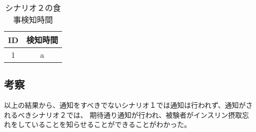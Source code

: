 \begin{table}[htbp]
  \caption{シナリオ２の食事検知時間}
  \label{tb:scenario_2_meal}
  \begin{center}
    \begin{tabular}{|c||c|}
      \hline
      ID  & 検知時間 \\
      \hline\hline
      1 &  a \\\hline
    \end{tabular}
  \end{center}
\end{table}

\subsection{考察}

以上の結果から、通知をすべきでないシナリオ１では通知は行われず、通知がされるべきシナリオ２では、
期待通り通知が行われ、被験者がインスリン摂取忘れをしていることを知らせることができることがわかった。

